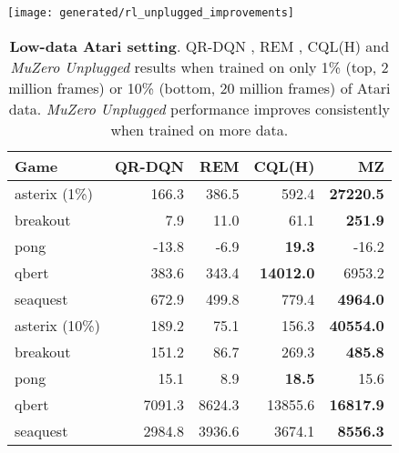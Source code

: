 \documentclass{article}
\newcommand{\mzunplugged}{\emph{MuZero Unplugged}}
\begin{document}
\begin{figure*}
\texttt{[image: generated/rl\_unplugged\_improvements]}
\vspace*{-7mm}
\caption[]{
\label{fig:rl-unplugged-atari-improvements}
\textbf{Atari performance improvement.} Improvement of performance with respect to the online DQN version that was used to generate the training data for the 46 Atari games from RL Unplugged, calculated as .  is random performance,  is the same performance as the training data, and larger than  represents an improvement. \mzunplugged{} shows very robust performance, reaching the same or higher score in 44 games, with a small decrease in only 2 games.
}
\end{figure*}


\begin{table}
\begin{center}
\begin{tabularx}{0.95\columnwidth}{l@{\hspace{-5pt}}rrrr}
\toprule
Game & QR-DQN & REM & CQL(H) & MZ \\

\midrule
asterix (1\%) & 166.3 & 386.5 & 592.4 & \textbf{27220.5}\\
breakout & 7.9 & 11.0 & 61.1 & \textbf{251.9}\\
pong & -13.8 & -6.9 & \textbf{19.3} & -16.2\\
qbert & 383.6 & 343.4 & \textbf{14012.0} & 6953.2\\
seaquest & 672.9 & 499.8 & 779.4 & \textbf{4964.0}\\
\midrule
asterix (10\%) & 189.2 & 75.1 & 156.3 & \textbf{40554.0}\\
breakout & 151.2 & 86.7 & 269.3 & \textbf{485.8}\\
pong & 15.1 & 8.9 & \textbf{18.5} & 15.6\\
qbert & 7091.3 & 8624.3 & 13855.6 & \textbf{16817.9}\\
seaquest & 2984.8 & 3936.6 & 3674.1 & \textbf{8556.3}\\
\bottomrule
\end{tabularx}
\end{center}
 \caption{
\label{tab:atari-low-data}
\textbf{Low-data Atari setting}. QR-DQN \cite{qr-dqn}, REM \cite{agarwal2020optimistic}, CQL(H) \cite{kumar2020conservative} and \mzunplugged{} results when trained on only 1\% (top, 2 million frames) or 10\% (bottom, 20 million frames) of Atari data. \mzunplugged{} performance improves consistently when trained on more data.
}
\end{table}
\end{document}
